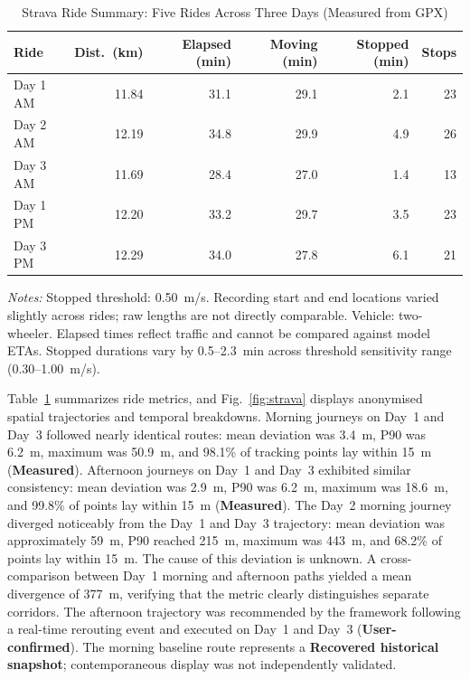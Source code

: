 \documentclass[11pt,conference]{IEEEtran}
\begin{document}
\begin{table}[t]
\caption{Strava Ride Summary: Five Rides Across Three Days (Measured from GPX)}
\label{tab:strava}
\centering
\footnotesize
\setlength{\tabcolsep}{2pt}
\renewcommand{\arraystretch}{1.08}
\begin{tabular}{@{}lrrrrr@{}}
\hline
\textbf{Ride} & \textbf{Dist.\ (km)} & \textbf{Elapsed (min)} & \textbf{Moving (min)} & \textbf{Stopped (min)} & \textbf{Stops} \\
\hline
Day 1 AM & 11.84 & 31.1 & 29.1 & 2.1 & 23 \\
Day 2 AM & 12.19 & 34.8 & 29.9 & 4.9 & 26 \\
Day 3 AM & 11.69 & 28.4 & 27.0 & 1.4 & 13 \\
Day 1 PM & 12.20 & 33.2 & 29.7 & 3.5 & 23 \\
Day 3 PM & 12.29 & 34.0 & 27.8 & 6.1 & 21 \\
\hline
\end{tabular}
\vspace{2pt}
\begin{minipage}{\columnwidth}
\scriptsize
\textit{Notes:} Stopped threshold: 0.50~m/s. Recording start and end locations varied slightly across rides; raw lengths are not directly comparable. Vehicle: two-wheeler. Elapsed times reflect traffic and cannot be compared against model ETAs. Stopped durations vary by 0.5--2.3~min across threshold sensitivity range (0.30--1.00~m/s).
\end{minipage}
\end{table}

Table~\ref{tab:strava} summarizes ride metrics, and Fig.~\ref{fig:strava} displays anonymised spatial trajectories and temporal breakdowns.
Morning journeys on Day~1 and Day~3 followed nearly identical routes: mean deviation was 3.4~m, P90 was 6.2~m, maximum was 50.9~m, and 98.1\% of tracking points lay within 15~m (\textbf{Measured}).
Afternoon journeys on Day~1 and Day~3 exhibited similar consistency: mean deviation was 2.9~m, P90 was 6.2~m, maximum was 18.6~m, and 99.8\% of points lay within 15~m (\textbf{Measured}).
The Day~2 morning journey diverged noticeably from the Day~1 and Day~3 trajectory: mean deviation was approximately 59~m, P90 reached 215~m, maximum was 443~m, and 68.2\% of points lay within 15~m.
The cause of this deviation is unknown.
A cross-comparison between Day~1 morning and afternoon paths yielded a mean divergence of 377~m, verifying that the metric clearly distinguishes separate corridors.
The afternoon trajectory was recommended by the framework following a real-time rerouting event and executed on Day~1 and Day~3 (\textbf{User-confirmed}).
The morning baseline route represents a \textbf{Recovered historical snapshot}; contemporaneous display was not independently validated.
\end{document}

